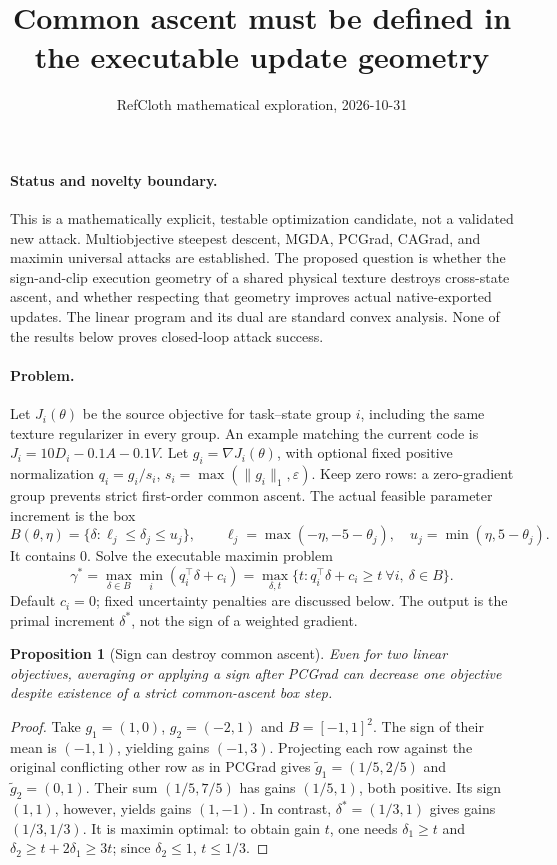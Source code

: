 \documentclass[10pt]{article}
\title{Common ascent must be defined in the executable update geometry}
\author{RefCloth mathematical exploration, 2026-10-31}
\date{}
\newtheorem{proposition}{Proposition}
\begin{document}
\maketitle

\paragraph{Status and novelty boundary.}
This is a mathematically explicit, testable optimization candidate, not a
validated new attack. Multiobjective steepest descent, MGDA, PCGrad, CAGrad,
and maximin universal attacks are established. The proposed question is whether
the sign-and-clip execution geometry of a shared physical texture destroys
cross-state ascent, and whether respecting that geometry improves actual
native-exported updates. The linear program and its dual are standard convex
analysis. None of the results below proves closed-loop attack success.

\paragraph{Problem.}
Let $J_i(\theta)$ be the source objective for task--state group $i$, including
the same texture regularizer in every group. An example matching the current
code is $J_i=10D_i-0.1A-0.1V$. Let $g_i=\nabla J_i(\theta)$, with optional
fixed positive normalization $q_i=g_i/s_i$, $s_i=\max(\|g_i\|_1,\varepsilon)$.
Keep zero rows: a zero-gradient group prevents strict first-order common ascent.
The actual feasible parameter increment is the box
\[
 B(\theta,\eta)=\{\delta:\ell_j\leq\delta_j\leq u_j\},\qquad
 \ell_j=\max(-\eta,-5-\theta_j),\quad
 u_j=\min(\eta,5-\theta_j).
\]
It contains $0$. Solve the executable maximin problem
\begin{equation}\label{eq:primal}
 \gamma^*=\max_{\delta\in B}\min_i(q_i^\top\delta+c_i)
 =\max_{\delta,t}\{t:q_i^\top\delta+c_i\geq t\ \forall i,\ \delta\in B\}.
\end{equation}
Default $c_i=0$; fixed uncertainty penalties are discussed below. The output is
the primal increment $\delta^*$, not the sign of a weighted gradient.

\begin{proposition}[Sign can destroy common ascent]
Even for two linear objectives, averaging or applying a sign after PCGrad can
decrease one objective despite existence of a strict common-ascent box step.
\end{proposition}
\begin{proof}
Take $g_1=(1,0)$, $g_2=(-2,1)$ and $B=[-1,1]^2$.
The sign of their mean is $(-1,1)$, yielding gains $(-1,3)$.
Projecting each row against the original conflicting other row as in PCGrad
gives $\widetilde g_1=(1/5,2/5)$ and $\widetilde g_2=(0,1)$.
Their sum $(1/5,7/5)$ has gains $(1/5,1)$, both positive. Its sign $(1,1)$,
however, yields gains $(1,-1)$. In contrast, $\delta^*=(1/3,1)$ gives gains
$(1/3,1/3)$. It is maximin optimal: to obtain gain $t$, one needs
$\delta_1\geq t$ and $\delta_2\geq t+2\delta_1\geq3t$; since
$\delta_2\leq1$, $t\leq1/3$.
\end{proof}
\end{document}
